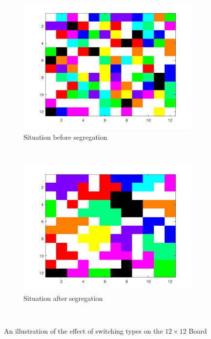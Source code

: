 \begin{figure}[H]
	\centering
    \begin{subfigure}{0.45\textwidth}
        \includegraphics[width=\textwidth]{Voorbeeld12_12_begin}
        \caption{Situation before segregation}
        \label{fig:wis12b}
    \end{subfigure}\hspace{0cm}
    ~ 
    \begin{subfigure}{0.45\textwidth}
        \includegraphics[width=\textwidth]{Voorbeeld12_12_eind}
        \caption{Situation after segregation}
        \label{fig:wis12a}
    \end{subfigure}
    ~ 
    \caption{An illustration of the effect of switching types on the \(12 \times 12\) Board}
    \label{fig:wissel 12}
\end{figure}

